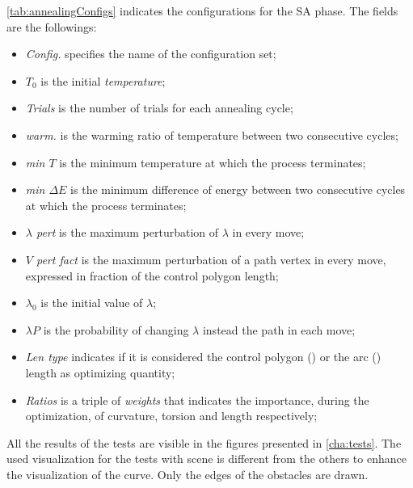 \documentclass[dissertation.tex]{subfiles}
\begin{document}
\cref{tab:annealingConfigs} indicates the configurations for the
\ac{SA} phase. The fields are the followings:
\begin{itemize}
\item \emph{Config.} specifies the name of the configuration set;
\item \emph{$T_0$} is the initial \emph{temperature};
\item \emph{Trials} is the number of trials for each annealing cycle;
\item \emph{warm.} is the warming ratio of temperature between two
  consecutive cycles;
\item \emph{min $T$} is the minimum temperature at which the process terminates;
\item \emph{min $\Delta E$} is the minimum difference of energy
  between two consecutive cycles at which the process terminates;
\item \emph{$\lambda$ pert} is the maximum perturbation of $\lambda$
  in every move;
\item \emph{$V$ pert fact}  is the maximum perturbation of a path vertex
  in every move, expressed in fraction of the control polygon length;
\item \emph{$\lambda_0$} is the initial value of $\lambda$;
\item \emph{$\lambda P$} is the probability of changing $\lambda$
  instead the path in each move;
\item \emph{Len type} indicates if it is considered the
  control polygon (\lenPol) or the arc (\lenArc) length as optimizing quantity;
\item \emph{Ratios} is a triple of \emph{weights} that indicates the
  importance, during the
  optimization, of curvature, torsion and length respectively;
\end{itemize}


All the results of the tests are visible in the figures presented in
\cref{cha:tests}. The used visualization for the tests with scene
\sceneB is different from the others to enhance the visualization of
the curve. Only the edges of the obstacles are drawn. 
\end{document}

